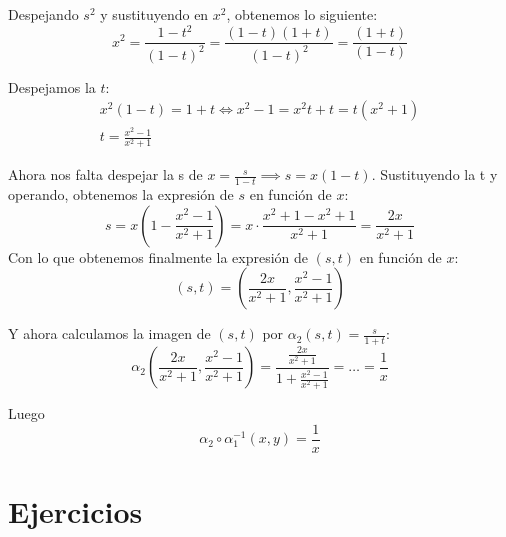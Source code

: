 \documentclass[palatino]{apuntes}
\begin{document}
Despejando $s^2$ y sustituyendo en $x^2$, obtenemos lo siguiente:
\[ x^2 = \frac{1 - t^2}{(1-t)^2} = \frac{(1-t)(1+t)}{(1-t)^2} = \frac{(1+t)}{(1-t)} \]

Despejamos la $t$:
\begin{gather*}
	x^2(1-t) = 1+t \iff x^2 - 1 = x^2t + t = t(x^2 + 1)\\
	t = \frac{x^2 - 1}{x^2 + 1}
\end{gather*}

Ahora nos falta despejar la s de $x = \frac{s}{1-t} \implies s = x (1-t)$. Sustituyendo la t y operando, obtenemos la expresión de $s$ en función de $x$:
\[ s = x (1 - \frac{x^2-1}{x^2+1}) = x \cdot \frac{x^2 + 1 - x^2 + 1}{x^2+1} = \frac{2x}{x^2+1} \]
Con lo que obtenemos finalmente la expresión de $(s,t)$ en función de $x$:
\[ (s,t) = (\frac{2x}{x^2+1}, \frac{x^2-1}{x^2+1}) \]

Y ahora calculamos la imagen de $(s,t)$ por $\alpha_2(s,t) = \frac{s}{1+t}$:
\[ \alpha_2(\frac{2x}{x^2+1},\frac{x^2-1}{x^2+1}) = \frac{\frac{2x}{x^2+1}}{1+\frac{x^2-1}{x^2+1}} = \dots = \frac{1}{x} \]

Luego
\[ \alpha_2 \circ \alpha_1^{-1}(x,y) = \frac{1}{x} \]

\chapter{Ejercicios}


{}
\printindex
\end{document}
